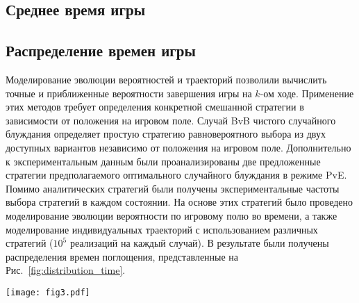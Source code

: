 \subsection{Среднее время игры}\label{sec:ch3/sec3/sub1}

\subsection{Распределение времен игры}\label{sec:ch3/sec3/sub2}

Моделирование эволюции вероятностей и траекторий позволили вычислить точные и приближенные вероятности завершения игры на $k$-ом ходе. 
Применение этих методов требует определения конкретной смешанной стратегии в зависимости от положения на игровом поле. 
Случай BvB чистого случайного блуждания определяет простую стратегию равновероятного выбора из двух доступных вариантов независимо от положения на игровом поле. 
Дополнительно к экспериментальным данным были проанализированы две предложенные стратегии предполагаемого оптимального случайного блуждания в режиме PvE. 
Помимо аналитических стратегий были получены экспериментальные частоты выбора стратегий в каждом состоянии. 
На основе этих стратегий было проведено моделирование эволюции вероятности по игровому полю во времени, 
а также моделирование индивидуальных траекторий с использованием различных стратегий ($10^5$ реализаций на каждый случай). 
В результате были получены распределения времен поглощения, представленные на Рис.~\cref{fig:distribution_time}.

\begin{figure*}[t]
    \centering
    \texttt{[image: fig3.pdf]}
    \caption{
        Распределение количества ходов, полученное моделированием эволюции вероятности (сплошная линия) и численным моделированием (точки) 
        с использованием соответствующих стратегий игроков A и B. 
        Режим BvB (красная линия) представляет собой равновероятный выбор для обоих игроков. Кривые PvE (зеленый и синий) и PvP-режим (фиолетовая линия) 
        были построены на основе соответствующих усредненных стратегий по популяции. Противоположная стратегия в режиме PvE -- это стратегия равновероятного выбора. 
        Оптимальная стратегия для режима PvE в центре (зеленая пунктирная линия) -- держать фишку на диагональной лестнице. Оптимальная стратегия для режима границы PvE 
        (синяя пунктирная линия) -- выбирать движения только вдоль горизонтальной линии. Гистограммы, полученные экспериментально, представлены для режимов PvE 
        (зеленая и синяя области).
    }  
    \label{fig:distribution_time}
    
\end{figure*}


